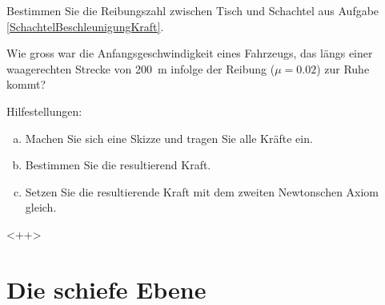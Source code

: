 \documentclass[12pt,a4paper,twoside]{article}
\def\dir{./Aufgaben_Mechanik/}
\newcommand{\Einbinden}[1]{}
\begin{document}
\begin{aufgabe}
	Bestimmen Sie die Reibungszahl zwischen Tisch und Schachtel aus Aufgabe \ref{SchachtelBeschleunigungKraft}.
\end{aufgabe}

\Einbinden{\dir/reibung05.tex}
\Einbinden{\dir/reibung06.tex}
\Einbinden{\dir/reibung04.tex}
\Einbinden{\dir/reibung07.tex}

\newpage

\Einbinden{\dir/kraefte.tex}

\newpage

\begin{aufgabe}
	Wie gross war die Anfangsgeschwindigkeit eines Fahrzeugs, das längs einer waagerechten Strecke von
	\SI{200}{m} infolge der Reibung ($\mu=\num{0.02}$) zur Ruhe kommt?

	Hilfestellungen:
	\begin{enumerate} [a)]
		\item Machen Sie sich eine Skizze und tragen Sie alle Kräfte ein.
		\item Bestimmen Sie die resultierend Kraft.
		\item Setzen Sie die resultierende Kraft mit dem zweiten Newtonschen Axiom gleich.
	\end{enumerate}<++>
\end{aufgabe}


%

%
%
%


%
%



\newpage

\section*{Die schiefe Ebene}
\end{document}
